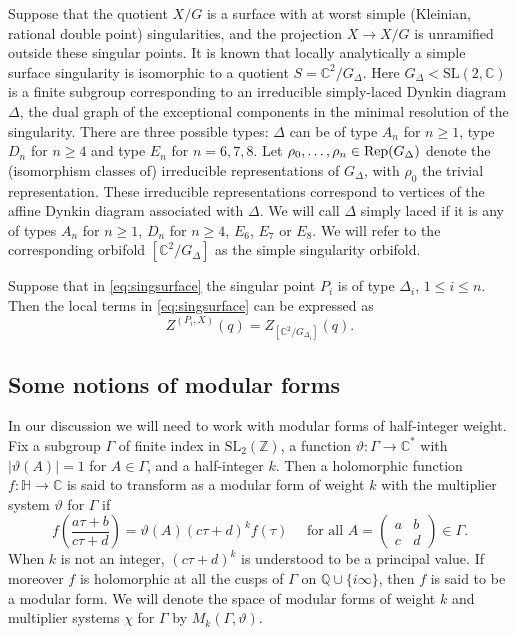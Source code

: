 \documentclass[11pt,a4paper]{amsart}
\theoremstyle{definition}
\newcommand{\SZ}{\mathbb{Z}}                    %
\newcommand{\SQ}{\mathbb{Q}}                    %
\newcommand{\SC}{\mathbb{C}}                    %
\begin{document}
Suppose that the quotient $X/G$ is a surface with at worst simple (Kleinian, rational 
double point) singularities, and the projection $ X \to X/G$ is unramified outside these singular points. 
It is known that locally analytically a simple surface singularity is isomorphic to a quotient $S=\SC^2/G_\Delta$. Here $G_\Delta<\mathrm{SL}(2,\SC)$ is a finite subgroup corresponding to an irreducible simply-laced Dynkin diagram $\Delta$, the dual graph of the
exceptional components in the minimal resolution of the singularity. There are three possible types: 
$\Delta$ can be of type $A_n$ for $n\geq 1$, type $D_n$ for $n\geq 4$ and type $E_n$ for $n=6,7,8$. 
Let $\rho_0,\ldots,\rho_n\in\mathop{\rm Rep}(G_\Delta)$ denote the (isomorphism classes of) irreducible representations of $G_\Delta$, with $\rho_0$ the trivial representation. These irreducible representations correspond to vertices of the affine Dynkin diagram associated with $\Delta$. %
We will call $\Delta$ simply laced if it is any  of types $A_n$ for $n \geq 1$, $D_n$ for $n \geq 4$, $E_6$, $E_7$ or $E_8$. We will refer to the corresponding orbifold $[\SC^2/G_\Delta]$ as the simple singularity orbifold. 

Suppose that in \eqref{eq:singsurface} the singular point $P_i$ is of type $\Delta_i$, $1 \leq i \leq n$. Then the local terms in \eqref{eq:singsurface} can be expressed as
\begin{equation} Z^{(P_i, X)}(q) = Z_{[\SC^2/G_{\Delta_i}]}(q). \label{eq:localterms} \end{equation}

\subsection{Some notions of modular forms}
In our discussion we will need to work with modular forms of half-integer weight. Fix a subgroup $\Gamma$ of finite index in $\mathrm{SL_2}(\SZ)$, a function $\vartheta \colon \Gamma \to \SC^{\ast}$ with $|\vartheta(A)|=1$ for $A \in \Gamma$, and a half-integer $k$. Then a holomorphic function $f \colon \mathbb{H} \to \SC$ is said to transform as a modular form of weight $k$ with the multiplier system $\vartheta$ for $\Gamma$ if
\[ f\left( \frac{a\tau+b}{c\tau+d}\right)=\vartheta(A)(c\tau+d)^k f(\tau) \quad \textrm{ for all } A=\begin{pmatrix}
a & b \\ c & d
\end{pmatrix} \in \Gamma. \]
When $k$ is not an integer, $(c\tau+d)^k$ is understood to be a principal value. If moreover $f$ is holomorphic at all the cusps of $\Gamma$ on $\SQ \cup \{i \infty\}$, then $f$ is said to be a modular form. We will denote the space of modular forms of weight $k$ and multiplier systems $\chi$ for $\Gamma$ by $M_k(\Gamma, \vartheta)$.
\end{document}
